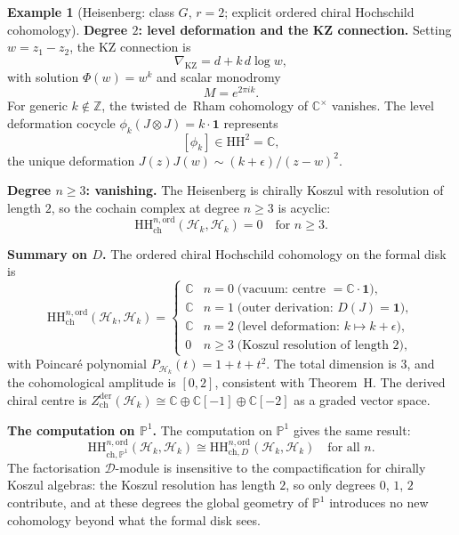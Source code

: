 \documentclass[11pt,reqno]{amsart}
\theoremstyle{definition}
\newtheorem{example}[theorem]{Example}
\theoremstyle{remark}
\newcommand{\cD}{\mathcal{D}}
\newcommand{\cH}{\mathcal{H}}
\newcommand{\HH}{\mathrm{HH}}
\newcommand{\CC}{\mathbb{C}}
\newcommand{\ZZ}{\mathbb{Z}}
\newcommand{\PP}{\mathbb{P}}
\numberwithin{equation}{section}
\begin{document}
\begin{example}[Heisenberg: class $G$, $r = 2$;
explicit ordered chiral Hochschild cohomology]
\medskip
\noindent
\textbf{Degree $2$: level deformation and the KZ connection.}
Setting $w = z_1 - z_2$, the KZ connection is
\begin{equation}\label{eq:kz-heis-2}
\nabla_{\mathrm{KZ}} = d + k\, d\log w,
\end{equation}
with solution $\Phi(w) = w^k$ and scalar monodromy
\begin{equation}\label{eq:heis-monodromy}
M = e^{2\pi i k}.
\end{equation}
For generic $k \notin \ZZ$, the twisted de~Rham cohomology
of $\CC^\times$ vanishes. The level deformation cocycle
$\phi_k(J \otimes J) = k \cdot \mathbf{1}$ represents
\begin{equation}\label{eq:heis-hh2}
[\phi_k] \in \HH^2 = \CC,
\end{equation}
the unique deformation
$J(z)J(w) \sim (k+\epsilon)/(z-w)^2$.

\medskip
\noindent
\textbf{Degree $n \geq 3$: vanishing.}
The Heisenberg is chirally Koszul with resolution of
length $2$, so the cochain complex at degree $n \geq 3$ is
acyclic:
\begin{equation}\label{eq:heis-higher-vanish}
\HH^{n,\mathrm{ord}}_{\mathrm{ch}}(\cH_k, \cH_k) = 0
\quad \text{for } n \geq 3.
\end{equation}

\medskip
\noindent
\textbf{Summary on $D$.}
The ordered chiral Hochschild cohomology on the formal disk is
\begin{equation}\label{eq:heis-hh-summary}
\HH^{n,\mathrm{ord}}_{\mathrm{ch}}(\cH_k, \cH_k) =
\begin{cases}
\CC & n = 0 \;\text{(vacuum: centre $= \CC \cdot \mathbf{1}$)}, \\
\CC & n = 1 \;\text{(outer derivation: $D(J) = \mathbf{1}$)}, \\
\CC & n = 2 \;\text{(level deformation: $k \mapsto k + \epsilon$)}, \\
0 & n \geq 3 \;\text{(Koszul resolution of length $2$)},
\end{cases}
\end{equation}
with Poincar\'e polynomial $P_{\cH_k}(t) = 1 + t + t^2$.
The total dimension is $3$, and the cohomological amplitude
is $[0, 2]$, consistent with Theorem~H.
The derived chiral centre is
$Z^{\mathrm{der}}_{\mathrm{ch}}(\cH_k) \cong
\CC \oplus \CC[-1] \oplus \CC[-2]$
as a graded vector space.

\medskip
\noindent
\textbf{The computation on $\PP^1$.}
The computation on $\PP^1$ gives the same result:
\begin{equation}\label{eq:heis-hh-P1}
\HH^{n,\mathrm{ord}}_{\mathrm{ch,\PP^1}}(\cH_k, \cH_k)
\cong
\HH^{n,\mathrm{ord}}_{\mathrm{ch},D}(\cH_k, \cH_k)
\quad \text{for all } n.
\end{equation}
The factorisation $\cD$-module is insensitive to the
compactification for chirally Koszul algebras: the Koszul
resolution has length $2$, so only degrees $0$, $1$, $2$
contribute, and at these degrees the global geometry of $\PP^1$
introduces no new cohomology beyond what the formal disk sees.


\end{example}
\end{document}
